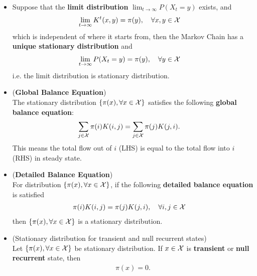 \documentclass[11pt]{article}
\begin{document}
\begin{itemize}
\item \begin{proposition}
Suppose that the \textbf{limit distribution} $\lim_{t\rightarrow \infty}P(X_t = y)$ exists, and 
\begin{align*}
\lim_{t\rightarrow \infty}K^{t}(x, y) &= \pi(y), \quad \forall x, y\in {\mathcal X}
\end{align*} which is independent of where it starts from, then the Markov Chain has a \textbf{unique stationary distribution} and 
\begin{align}
\lim_{t\rightarrow \infty}P(X_t = y) &= \pi(y), \quad \forall y \in {\mathcal X}
\end{align} i.e. the limit distribution is stationary distribution.
\end{proposition}

\item \begin{proposition} (\textbf{Global Balance Equation})\\
The stationary distribution $\left\{\pi(x), \forall x\in {\mathcal X}\right\}$ satisfies the following \textbf{global balance equation}:
\begin{align}
\sum_{j \in {\mathcal X}}\pi(i)K(i, j) &=  \sum_{j \in {\mathcal X}}\pi(j)K(j, i).  \label{eqn: mc_global_balance_eqn}
\end{align} This means the total flow out of $i$ (LHS) is equal to the total flow into $i$ (RHS) in steady state.
\end{proposition}

\item \begin{proposition} (\textbf{Detailed Balance Equation})\\
For distribution $\left\{\pi(x), \forall x\in {\mathcal X}\right\}$, if the following \textbf{detailed balance equation} is satisfied
\begin{align}
\pi(i)K(i, j) &=  \pi(j)K(j, i),\quad \forall i, j\in {\mathcal X}  \label{eqn: mc_detailed_balance_eqn}
\end{align} then $\left\{\pi(x), \forall x\in {\mathcal X}\right\}$ is a stationary distribution.
\end{proposition}


\item 
\begin{theorem} (Stationary distribution for transient and null recurrent states)\\
Let $\left\{\pi(x), \forall x\in {\mathcal X}\right\}$  be stationary distribution. If $x \in {\mathcal X}$ is \textbf{transient} or \textbf{null recurrent} state, then 
\begin{align*}
\pi(x) = 0.
\end{align*} 
\end{theorem}


\end{itemize}
\end{document}

